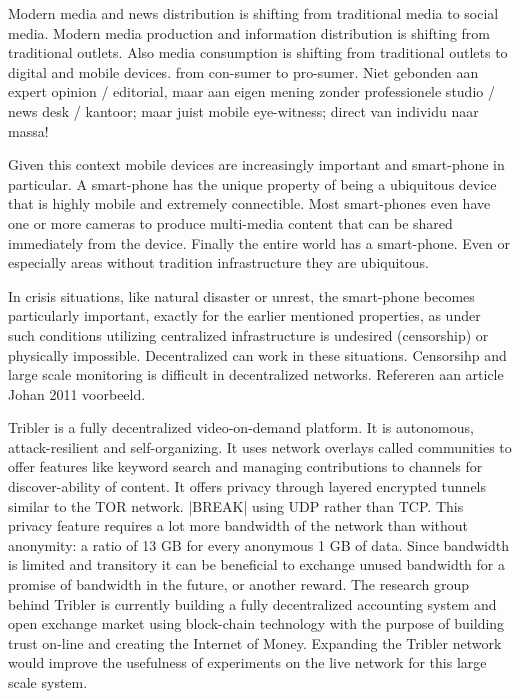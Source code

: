 Modern media and news distribution is shifting from traditional media to social media.
Modern media production and information distribution is shifting from traditional outlets.
Also media consumption is shifting from traditional outlets to digital and mobile devices.
from con-sumer to pro-sumer.
Niet gebonden aan expert opinion / editorial, maar aan eigen mening zonder professionele studio / news desk / kantoor; maar juist mobile eye-witness; direct van individu naar massa!

Given this context mobile devices are increasingly important and smart-phone in particular.
A smart-phone has the unique property of being a ubiquitous device that is highly mobile and extremely connectible.
Most smart-phones even have one or more cameras to produce multi-media content that can be shared immediately from the device.
Finally the entire world has a smart-phone.
Even or especially areas without tradition infrastructure they are ubiquitous.

In crisis situations, like natural disaster or unrest, the smart-phone becomes particularly important, exactly for the earlier mentioned properties, as under such conditions utilizing centralized infrastructure is undesired (censorship) or physically impossible.
Decentralized can work in these situations.
Censorsihp and large scale monitoring is difficult in decentralized networks.
Refereren aan article Johan 2011 voorbeeld.


Tribler is a fully decentralized video-on-demand platform.
It is autonomous, attack-resilient and self-organizing.
It uses network overlays called communities to offer features like keyword search and managing contributions to channels for discover-ability of content.
It offers privacy through layered encrypted tunnels similar to the TOR network. |BREAK| using UDP rather than TCP.
This privacy feature requires a lot more bandwidth of the network than without anonymity: a ratio of 13 GB for every anonymous 1 GB of data.
Since bandwidth is limited and transitory it can be beneficial to exchange unused bandwidth for a promise of bandwidth in the future, or another reward.
The research group behind Tribler is currently building a fully decentralized accounting system and open exchange market using block-chain technology with the purpose of building trust on-line and creating the Internet of Money.
Expanding the Tribler network would improve the usefulness of experiments on the live network for this large scale system.

